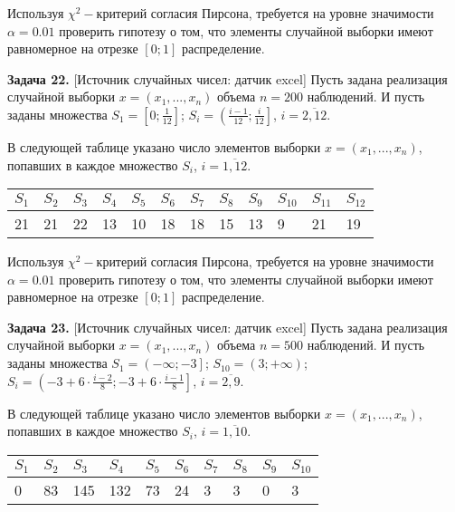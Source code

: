 Используя $\chi ^{2} -$критерий согласия Пирсона, требуется на уровне значимости $\alpha =0.01$ проверить гипотезу о том, что элементы случайной выборки имеют равномерное на отрезке $\left[0;1\right]$ распределение.



\textbf{Задача 22.} [Источник случайных чисел: датчик excel] Пусть задана реализация случайной выборки $x=\left(x_{1} ,...,x_{n} \right)$ объема $n=200$ наблюдений. И пусть заданы множества $S_{1} =\left[0;{\tfrac{1}{12}} \right]$; $S_{i} =\left({\tfrac{i-1}{12}} ;{\tfrac{i}{12}} \right]$, $i=\overline{2,12}$. 

В следующей таблице указано число элементов выборки $x=\left(x_{1} ,...,x_{n} \right)$, попавших в каждое множество $S_{i} $, $i=\overline{1,12}$.

\begin{tabular}{|p{0.3in}|p{0.3in}|p{0.3in}|p{0.3in}|p{0.3in}|p{0.3in}|p{0.3in}|p{0.3in}|p{0.3in}|p{0.3in}|p{0.3in}|p{0.3in}|} \hline 
$S_{1} $ & $S_{2} $ & $S_{3} $ & $S_{4} $ & $S_{5} $ & $S_{6} $ & $S_{7} $ & $S_{8} $ & $S_{9} $ & $S_{10} $ & $S_{11} $ & $S_{12} $ \\ \hline 
21 & 21 & 22 & 13 & 10 & 18 & 18 & 15 & 13 & 9 & 21 & 19 \\ \hline 
\end{tabular}



Используя $\chi ^{2} -$критерий согласия Пирсона, требуется на уровне значимости $\alpha =0.01$ проверить гипотезу о том, что элементы случайной выборки имеют равномерное на отрезке $\left[0;1\right]$ распределение.



\textbf{Задача 23.} [Источник случайных чисел: датчик excel] Пусть задана реализация случайной выборки $x=\left(x_{1} ,...,x_{n} \right)$ объема $n=500$ наблюдений. И пусть заданы множества $S_{1} =\left(-\infty ;-3\right]$; $S_{10} =\left(3;+\infty \right)$;$S_{i} =\left(-3+6\cdot {\tfrac{i-2}{8}} ;-3+6\cdot {\tfrac{i-1}{8}} \right]$, $i=\overline{2,9}$. 

В следующей таблице указано число элементов выборки $x=\left(x_{1} ,...,x_{n} \right)$, попавших в каждое множество $S_{i} $, $i=\overline{1,10}$.

\begin{tabular}{|p{0.3in}|p{0.3in}|p{0.3in}|p{0.3in}|p{0.3in}|p{0.3in}|p{0.3in}|p{0.3in}|p{0.3in}|p{0.3in}|} \hline 
$S_{1} $ & $S_{2} $ & $S_{3} $ & $S_{4} $ & $S_{5} $ & $S_{6} $ & $S_{7} $ & $S_{8} $ & $S_{9} $ & $S_{10} $ \\ \hline 
0 & 83 & 145 & 132 & 73 & 24 & 3 & 3 & 0 & 3 \\ \hline 
\end{tabular}



